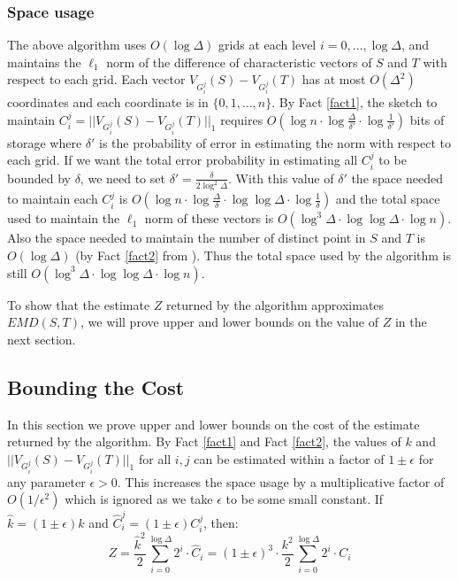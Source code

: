 \documentclass[oribibl]{llncs}
\begin{document}
\subsubsection{Space usage}
The above algorithm uses $O(\log\Delta)$ grids at each level
$i = 0,\ldots,\log\Delta$, and maintains the $\ell_1$ norm of the difference of
characteristic vectors of $S$ and $T$ with respect to each grid. Each vector
$V_{G_i^j}(S)-V_{G_i^j}(T)$ has at most $O(\Delta^2)$ coordinates and each
coordinate is in $\{0,1,\ldots,n\}$. By Fact \ref{fact1}, the sketch to maintain
$C_i^j = ||V_{G_i^j}(S)-V_{G_i^j}(T)||_1$ requires $O(\log n\cdot\log\frac{\Delta}{\delta'}\cdot\log\frac{1}{\delta'})$ bits of
storage where $\delta'$ is the probability of error in estimating the norm
with respect to each grid. If we want the total error probability in estimating
all $C_i^j$ to be bounded by $\delta$, we need to set $\delta' = \frac{\delta}{2\log^2\Delta}$.
With this value of $\delta'$ the space needed to maintain each $C_i^j$ is
$O(\log n\cdot\log\frac{\Delta}{\delta}\cdot\log\log\Delta\cdot\log\frac{1}{\delta})$
and the total space used to maintain the $\ell_1$ norm of these vectors is
$O(\log^3\Delta\cdot\log\log\Delta\cdot\log n)$. 
Also the space needed to maintain the number of
distinct point in $S$ and $T$ is $O(\log\Delta)$
(by Fact \ref{fact2} from \cite{bar_yossef}). 
Thus the total space used by the algorithm is still
$O(\log^3\Delta\cdot\log\log\Delta\cdot\log n)$.

To show that the estimate $Z$ returned by the algorithm approximates $EMD(S,T)$,
we will prove upper and lower bounds on the value of $Z$ in the next
section. 

\subsection{Bounding the Cost}\label{cost}
In this section we prove upper and lower bounds on the cost of the estimate
returned by the algorithm.
By Fact \ref{fact1} and Fact \ref{fact2}, the values of $k$ and
$||V_{G_i^j}(S)-V_{G_i^j}(T)||_1$ for all $i,j$ can be estimated within a factor
of $1\pm\epsilon$ for any parameter $\epsilon > 0$.
This increases the space usage by a multiplicative factor of $O(1/\epsilon^2)$
which is ignored as we take $\epsilon$ to be some small constant.
If $\widehat{k} = (1\pm\epsilon)k$ and $\widehat{C}_i^j = (1\pm\epsilon)C_i^j$,
then:
\begin{equation}
Z = \frac{\widehat{k}^2}{2}\sum_{i = 0}^{\log\Delta}2^i\cdot \widehat{C}_i 
= (1\pm\epsilon)^3\cdot \frac{k^2}{2}\sum_{i = 0}^{\log\Delta}2^i\cdot C_i
\end{equation}
\end{document}
